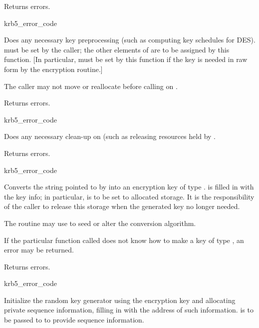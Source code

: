 Returns errors.

\begin{funcdecl}{krb5_error_code}{\funcvoid}
\end{funcdecl}
Does any necessary key preprocessing (such as computing key
schedules for DES).
 must be set by the caller; the
other elements of  are to be assigned by this function.
[In particular,  must be set by this
function if the key is needed in raw form by the encryption routine.]

The caller may not move or reallocate  before calling
 on .

Returns errors.

\begin{funcdecl}{krb5_error_code}{\funcvoid}
\end{funcdecl}
Does any necessary clean-up on  (such as releasing
resources held by .

Returns errors.

\begin{funcdecl}{krb5_error_code}{\funcvoid}
\end{funcdecl}
Converts the string pointed to by  into an encryption key
of type .   is filled in with
the key info; in particular,  is to
be set to allocated storage. It is the responsibility of the caller to
release this storage when the generated key no longer needed.

The routine may use  to seed or alter the conversion
algorithm.

If the particular function called does not know how to make a
key of type , an error may be returned.

Returns errors.

\begin{funcdecl}{krb5_error_code}{\funcvoid}
\end{funcdecl}
Initialize the random key generator using the encryption key
 and allocating private sequence information, filling
in  with the address of such information.
 is to be passed to  to provide
sequence information.

